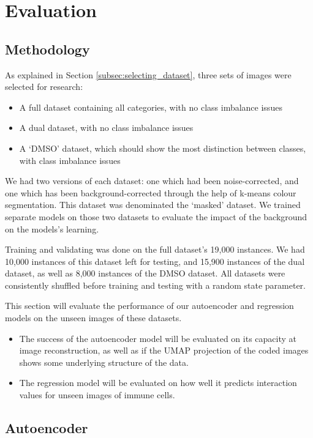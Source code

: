 \chapter{Evaluation}

\section{Methodology}

As explained in Section \ref{subsec:selecting_dataset}, three sets of images were selected for research:

\begin{itemize}
    \item A full dataset containing all categories, with no class imbalance issues
    \item A dual dataset, with no class imbalance issues
    \item A `DMSO' dataset, which should show the most distinction between classes, with class imbalance issues
\end{itemize}

We had two versions of each dataset: one which had been noise-corrected, and one which has been background-corrected through the help of k-means colour segmentation. This dataset was denominated the `masked' dataset. We trained separate models on those two datasets to evaluate the impact of the background on the models's learning.

Training and validating was done on the full dataset's 19,000 instances. We had 10,000 instances of this dataset left for testing, and 15,900 instances of the dual dataset, as well as 8,000 instances of the DMSO dataset. All datasets were consistently shuffled before training and testing with a random state parameter.

This section will evaluate the performance of our autoencoder and regression models on the unseen images of these datasets.

\begin{itemize}
    \item The success of the autoencoder model will be evaluated on its capacity at image reconstruction, as well as if the UMAP projection of the coded images shows some underlying structure of the data.
    \item The regression model will be evaluated on how well it predicts interaction values for unseen images of immune cells.
\end{itemize}

\section{Autoencoder}


